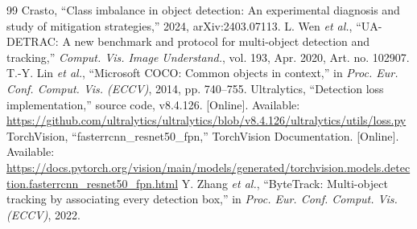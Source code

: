 \documentclass[10pt,journal,letterpaper]{IEEEtran}
\begin{document}
\begin{thebibliography}{99}
 Crasto, ``Class imbalance in object detection: An experimental diagnosis and study of mitigation strategies,'' 2024, arXiv:2403.07113.
 L. Wen \textit{et al.}, ``UA-DETRAC: A new benchmark and protocol for multi-object detection and tracking,'' \textit{Comput. Vis. Image Understand.}, vol. 193, Apr. 2020, Art. no. 102907.
 T.-Y. Lin \textit{et al.}, ``Microsoft COCO: Common objects in context,'' in \textit{Proc. Eur. Conf. Comput. Vis. (ECCV)}, 2014, pp. 740--755.
 Ultralytics, ``Detection loss implementation,'' source code, v8.4.126. [Online]. Available: \url{https://github.com/ultralytics/ultralytics/blob/v8.4.126/ultralytics/utils/loss.py}
 TorchVision, ``fasterrcnn\_resnet50\_fpn,'' TorchVision Documentation. [Online]. Available: \url{https://docs.pytorch.org/vision/main/models/generated/torchvision.models.detection.fasterrcnn_resnet50_fpn.html}
 Y. Zhang \textit{et al.}, ``ByteTrack: Multi-object tracking by associating every detection box,'' in \textit{Proc. Eur. Conf. Comput. Vis. (ECCV)}, 2022.
\end{thebibliography}
\end{document}
